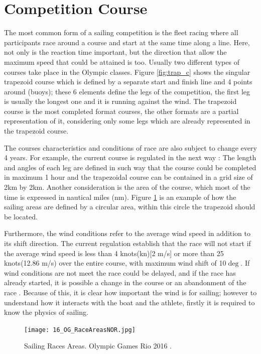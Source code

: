 \section{Competition Course}\label{tracks}
The most common form of a sailing competition is the fleet racing where all participants race around a course and start at the same time along a line. Here, not only is the reaction time important, but the direction that allow the maximum speed that could be attained is too. Usually two different types of courses take place in the Olympic classes. Figure \ref{fig:trap_c} shows the singular trapezoid course which is defined by a separate start and finish line and 4 points around (buoys); these 6 elements define the legs of the competition, the first leg is usually the longest one and it is running against the wind.
The trapezoid course is the most completed format courses, the other formats are a partial representation of it, considering only some legs which are already represented in the trapezoid course.\par 

The courses characteristics and conditions of race are also subject to change every 4 years.  For example, the current course is regulated in the next way \cite{race_pol}: The length and angles of each leg are defined in such way that the course could be completed in maximum 1 hour and the trapezoidal course can be contained in a grid size of 2km by 2km.  Another consideration is the area of the course,  which most of the time is expressed in nautical miles (nm). Figure \ref{fig:olymp_areas_rio} is an example of how the sailing areas are defined by a circular area, within this circle the trapezoid should be located. \par 
Furthermore, the wind conditions refer to the average wind speed in addition to its shift direction. The current regulation establish that the race will not start if the average wind speed is less than 4 knots(kn)[2 m/s] or more than 25 knots(12.86 m/s) over the entire course, with maximum wind shift of 10$\deg$. 
If wind conditions are not meet the race could be delayed, and if the race has already started, it is possible a change in the course or an abandonment of the race \cite{race_pol}. Because of this, it is clear how important the wind is for sailing; however to understand how it interacts with the boat and the athlete, firstly it is required to know the physics of sailing. \par 
\begin{figure}[ht]
\centering
 \texttt{[image: 16\_OG\_RaceAreasNOR.jpg]}
  \caption{Sailing Races Areas. Olympic Games Rio 2016 \cite{instr_rio}.}
\label{fig:olymp_areas_rio} 
\end{figure}


